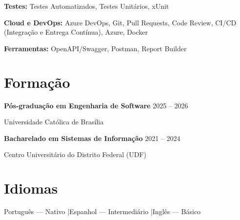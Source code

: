 \documentclass[11pt,a4paper]{article}
\begin{document}
\vspace{0.12cm}

\textbf{Testes:} Testes Automatizados, Testes Unitários, xUnit

\vspace{0.12cm}

\textbf{Cloud e DevOps:} Azure DevOps, Git, Pull Requests, Code Review, CI/CD (Integração e Entrega Contínua), Azure, Docker

\vspace{0.12cm}

\textbf{Ferramentas:} OpenAPI/Swagger, Postman, Report Builder

\section{Formação}

\textbf{Pós-graduação em Engenharia de Software}
\hfill 2025 -- 2026

Universidade Católica de Brasília

\vspace{0.2cm}

\textbf{Bacharelado em Sistemas de Informação}
\hfill 2021 -- 2024

Centro Universitário do Distrito Federal (UDF)

\section{Idiomas}

Português — Nativo \quad|\quad Espanhol — Intermediário \quad|\quad Inglês — Básico
\end{document}
